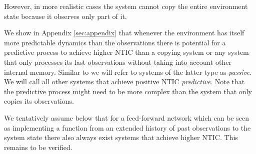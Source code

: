 \documentclass[utf8]{article}
\begin{document}
            
            However, in more realistic cases the system cannot copy the entire environment state because it observes only part of it. 
            

            We show in Appendix \ref{sec:appendix} that whenever the environment has itself more predictable dynamics than the observations there is potential for a predictive process to achieve higher NTIC than a copying system or any system that only processes its last observations without taking into account other internal memory. Similar to \citet{BERTSCHINGER.2006} we will refer to systems of the latter type as \textit{passive}. We will call all other systems that achieve positive NTIC \textit{predictive}. Note that the predictive process might need to be more complex than the system that only copies its observations.
            
            We tentatively assume below that for a feed-forward network which can be seen as implementing a function from an extended history of past observations to the system state there also always exist systems that achieve higher NTIC. This remains to be verified. 
            
            


            
            
            
            
            
            
\end{document}
